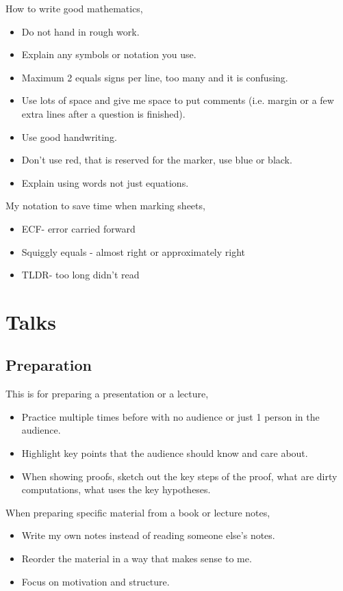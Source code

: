 \documentclass{article}
\begin{document}
How to write good mathematics,
\begin{itemize}
    \item Do not hand in rough work.
    \item Explain any symbols or notation you use.
    \item Maximum 2 equals signs per line, too many and it is confusing.
    \item Use lots of space and give me space to put comments (i.e. margin or a few extra lines after a question is finished).
    \item Use good handwriting.
    \item Don't use red, that is reserved for the marker, use blue or black.
    \item Explain using words not just equations.
\end{itemize}
My notation to save time when marking sheets,
\begin{itemize}
    \item ECF- error carried forward
    \item Squiggly equals - almost right or approximately right
    \item TLDR- too long didn't read
\end{itemize}

\section{Talks}
\subsection{Preparation}

This is for preparing a presentation or a lecture,
\begin{itemize}
    \item Practice multiple times before with no audience or just 1 person in the audience.
    \item Highlight key points that the audience should know and care about.
    \item When showing proofs, sketch out the key steps of the proof, what are dirty computations, what uses the key hypotheses.
\end{itemize}

When preparing specific material from a book or lecture notes,
\begin{itemize}
    \item Write my own notes instead of reading someone else's notes.
    \item Reorder the material in a way that makes sense to me.
    \item Focus on motivation and structure.
\end{itemize}
\end{document}
